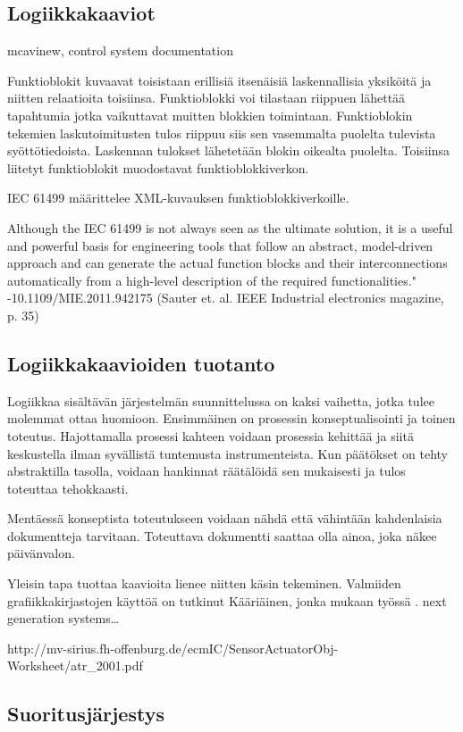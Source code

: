 \documentclass[finnish,12pt]{article}
\begin{document}
		\subsection{Logiikkakaaviot}
	
mcavinew, control system documentation

Funktioblokit kuvaavat toisistaan erillisiä itsenäisiä laskennallisia yksiköitä ja niitten relaatioita toisiinsa.
Funktioblokki voi tilastaan riippuen lähettää tapahtumia jotka vaikuttavat muitten blokkien toimintaan.
Funktioblokin tekemien laskutoimitusten tulos riippuu siis sen vasemmalta puolelta tulevista syöttötiedoista.
Laskennan tulokset lähetetään blokin oikealta puolelta.
Toisiinsa liitetyt funktioblokit muodostavat funktioblokkiverkon. 

IEC 61499 määrittelee XML-kuvauksen funktioblokkiverkoille. 

Although the IEC 61499 is not always seen as the ultimate solution, it is a useful and powerful basis for engineering tools that follow an abstract, model-driven approach and can generate the actual function blocks and their interconnections automatically from a high-level description of the required functionalities." -10.1109/MIE.2011.942175 (Sauter et. al. IEEE Industrial electronics magazine, p. 35)


		\subsection{Logiikkakaavioiden tuotanto}


Logiikkaa sisältävän järjestelmän suunnittelussa on kaksi vaihetta, jotka tulee molemmat ottaa huomioon.
Ensimmäinen on prosessin konseptualisointi ja toinen toteutus.
Hajottamalla prosessi kahteen voidaan prosessia kehittää ja siitä keskustella ilman syvällistä tuntemusta instrumenteista.
Kun päätökset on tehty abstraktilla tasolla, voidaan hankinnat räätälöidä sen mukaisesti ja tulos toteuttaa tehokkaasti.

Mentäessä konseptista toteutukseen voidaan nähdä että vähintään kahdenlaisia dokumentteja tarvitaan.
Toteuttava dokumentti saattaa olla ainoa, joka näkee päivänvalon. 

Yleisin tapa tuottaa kaavioita lienee niitten käsin tekeminen.
Valmiiden grafiikkakirjastojen käyttöä on tutkinut Kääriäinen, jonka mukaan työssä .
next generation systems…

http://mv-sirius.fh-offenburg.de/ecmIC/SensorActuatorObj-Worksheet/atr_2001.pdf

		\subsection{Suoritusjärjestys}
	
\end{document}
